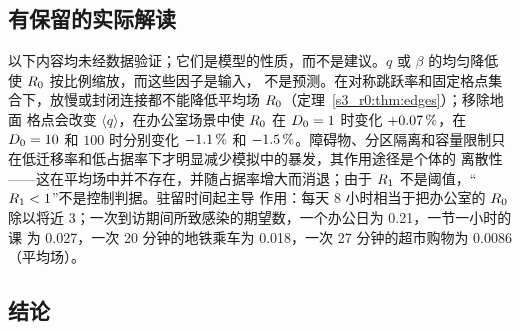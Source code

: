 \subsection{有保留的实际解读}\label{s9_discussion:sec:practice}

以下内容均未经数据验证；它们是模型的性质，而不是建议。$q$ 或 $\beta$ 的均匀降低使 $R_0$ 按比例缩放，而这些因子是输入，
不是预测。在对称跳跃率和固定格点集合下，放慢或封闭连接都不能降低平均场 $R_0$（定理~\ref{s3_r0:thm:edges}）；移除地面
格点会改变 $\langle q\rangle$，在办公室场景中使 $R_0$ 在 $D_0=1$ 时变化 $+0.07\,\%$，在 $D_0=10$ 和 $100$ 时分别变化
$-1.1\,\%$ 和 $-1.5\,\%$。障碍物、分区隔离和容量限制只在低迁移率和低占据率下才明显减少模拟中的暴发，其作用途径是个体的
离散性——这在平均场中并不存在，并随占据率增大而消退；由于 $R_1$ 不是阈值，“$R_1<1$”不是控制判据。驻留时间起主导
作用：每天 8 小时相当于把办公室的 $R_0$ 除以将近 3；一次到访期间所致感染的期望数，一个办公日为 0.21，一节一小时的课
为 0.027，一次 20 分钟的地铁乘车为 0.018，一次 27 分钟的超市购物为 0.0086（平均场）。

\subsection{结论}\label{s9_discussion:sec:conclusions}

